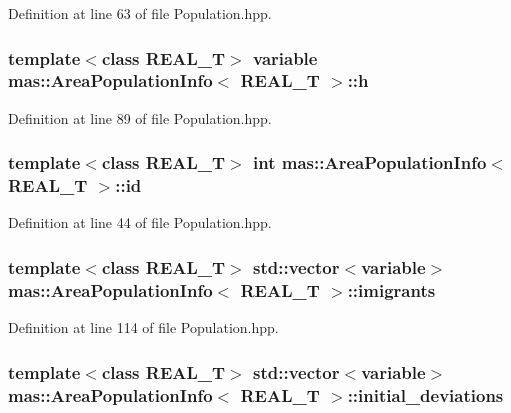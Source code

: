 Definition at line 63 of file Population.\-hpp.

\hypertarget{structmas_1_1_area_population_info_ad3d38ac9eaa0d47c65aff338751b6246}{
\subsubsection[{h}]{\setlength{\rightskip}{0pt plus 5cm}template$<$class R\-E\-A\-L\-\_\-\-T$>$ {\bf variable} {\bf mas\-::\-Area\-Population\-Info}$<$ R\-E\-A\-L\-\_\-\-T $>$\-::h}}\label{structmas_1_1_area_population_info_ad3d38ac9eaa0d47c65aff338751b6246}


Definition at line 89 of file Population.\-hpp.

\hypertarget{structmas_1_1_area_population_info_a1794b6f07e5bd538fdce710d62617f71}{
\subsubsection[{id}]{\setlength{\rightskip}{0pt plus 5cm}template$<$class R\-E\-A\-L\-\_\-\-T$>$ int {\bf mas\-::\-Area\-Population\-Info}$<$ R\-E\-A\-L\-\_\-\-T $>$\-::id}}\label{structmas_1_1_area_population_info_a1794b6f07e5bd538fdce710d62617f71}


Definition at line 44 of file Population.\-hpp.

\hypertarget{structmas_1_1_area_population_info_ac5d5a79a364772e7a089e4ee6c2d07d8}{
\subsubsection[{imigrants}]{\setlength{\rightskip}{0pt plus 5cm}template$<$class R\-E\-A\-L\-\_\-\-T$>$ std\-::vector$<${\bf variable}$>$ {\bf mas\-::\-Area\-Population\-Info}$<$ R\-E\-A\-L\-\_\-\-T $>$\-::imigrants}}\label{structmas_1_1_area_population_info_ac5d5a79a364772e7a089e4ee6c2d07d8}


Definition at line 114 of file Population.\-hpp.

\hypertarget{structmas_1_1_area_population_info_ac172313ebaa727bc964575f00effff02}{
\subsubsection[{initial\-\_\-deviations}]{\setlength{\rightskip}{0pt plus 5cm}template$<$class R\-E\-A\-L\-\_\-\-T$>$ std\-::vector$<${\bf variable}$>$ {\bf mas\-::\-Area\-Population\-Info}$<$ R\-E\-A\-L\-\_\-\-T $>$\-::initial\-\_\-deviations}}\label{structmas_1_1_area_population_info_ac172313ebaa727bc964575f00effff02}


